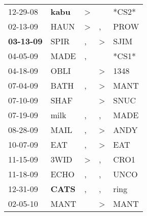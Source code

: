 \begin{supertabular}{p{0.07\textwidth}p{0.06\textwidth}p{0.02\textwidth}p{0.02\textwidth}p{0.06\textwidth}}
          12-29-08\textsuperscript{} &  \textbf{kabu\textsuperscript{}} &     \textgreater &                  &                            *CS2* \\
          02-13-09\textsuperscript{} &           HAUN\textsuperscript{} &     \textgreater &                , &           PROW\textsuperscript{} \\
 \textbf{03-13-09\textsuperscript{}} &           SPIR\textsuperscript{} &                , &     \textgreater &           SJIM\textsuperscript{} \\
          04-05-09\textsuperscript{} &           MADE\textsuperscript{} &                , &                  &                            *CS1* \\
          04-18-09\textsuperscript{} &           OBLI\textsuperscript{} &                  &     \textgreater &           1348\textsuperscript{} \\
          07-04-09\textsuperscript{} &           BATH\textsuperscript{} &                , &     \textgreater &           MANT\textsuperscript{} \\
          07-10-09\textsuperscript{} &           SHAF\textsuperscript{} &                  &     \textgreater &           SNUC\textsuperscript{} \\
          07-19-09\textsuperscript{} &           milk\textsuperscript{} &                , &                , &           MADE\textsuperscript{} \\
          08-28-09\textsuperscript{} &           MAIL\textsuperscript{} &                , &     \textgreater &           ANDY\textsuperscript{} \\
          10-07-09\textsuperscript{} &            EAT\textsuperscript{} &                , &     \textgreater &            EAT\textsuperscript{} \\
          11-15-09\textsuperscript{} &           3WID\textsuperscript{} &     \textgreater &                , &           CRO1\textsuperscript{} \\
          11-18-09\textsuperscript{} &           ECHO\textsuperscript{} &                , &                , &           UNCO\textsuperscript{} \\
          12-31-09\textsuperscript{} &  \textbf{CATS\textsuperscript{}} &                , &                , &           ring\textsuperscript{} \\
          02-05-10\textsuperscript{} &           MANT\textsuperscript{} &                  &     \textgreater &           MANT\textsuperscript{} \\

\end{supertabular}
